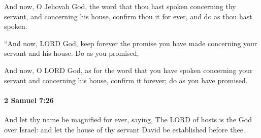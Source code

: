 			\begin{versebox}
					\item[BHS] 
					\item[ASV] And now, O Jehovah God, the word that thou hast spoken concerning thy servant, and concerning his house, confirm thou it for ever, and do as thou hast spoken.
					\item[NIV] “And now, LORD God, keep forever the promise you have made concerning your servant and his house. Do as you promised,
					\item[NRSV] And now, O LORD God, as for the word that you have spoken concerning your servant and concerning his house, confirm it forever; do as you have promised.
			\end{versebox}

		\paragraph{2 Samuel 7:26} %
			\label{2SAMUEL-7-26}

			And let thy name be magnified for ever, saying, The LORD of hosts is the God over Israel: and let the house of thy servant David be established before thee.

